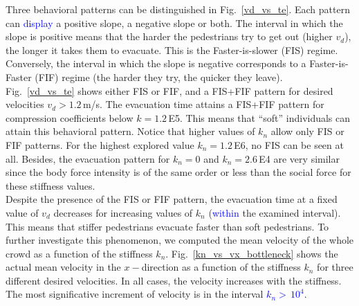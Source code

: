 \documentclass[preprint,12pt]{elsarticle}
\begin{document}
Three behavioral patterns can be distinguished in Fig.~\ref{vd_vs_te}. 
Each pattern can \textcolor{blue}{display} a positive slope, a negative slope
or both. The interval in which the slope is positive means that the 
harder the pedestrians try to get out (higher $v_d$), the 
longer it takes them to evacuate. This is the Faster-is-slower 
(FIS) regime. Conversely, the interval in which the slope is 
negative  corresponds to a Faster-is-Faster (FIF) regime (the 
harder they try, the quicker they leave).\\

Fig.~\ref{vd_vs_te}  shows either FIS or FIF, and a FIS+FIF pattern
for desired velocities $v_d>1.2\,$m/s. The 
evacuation time attains a FIS+FIF pattern for compression coefficients below 
$k=1.2\,$E5. This means that ``soft'' individuals can attain this 
behavioral pattern.  Notice that higher values of $k_n$ allow 
only FIS or FIF patterns. For the highest explored value $k_n=1.2\,$E6, no 
FIS can be seen at all. Besides, the evacuation pattern for $k_n = 0$ and $k_n 
= 2.6\,$E4 are very similar since the body force intensity is of the same order
or less than the social 
force for these stiffness values. \\

Despite the presence of the FIS or FIF pattern, the evacuation time at a 
fixed value of $v_d$ decreases for increasing values of $k_n$ (\textcolor{blue}{within} the examined interval). 
This means that stiffer pedestrians evacuate faster than soft pedestrians. 
To further investigate this 
phenomenon, we computed the mean velocity of the whole crowd as a function of the 
stiffness $k_n$. Fig.~\ref{kn_vs_vx_bottleneck} shows the actual mean velocity in the 
$x-$direction as a function of the stiffness $k_n$ for three different desired 
velocities. In all cases, the velocity increases with the stiffness. The most significative 
increment of velocity is in the interval \textcolor{blue}{$k_n>\,10^{4}$}. \\
\end{document}
